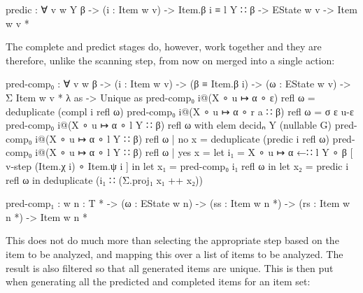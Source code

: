 		\begin{code}
			  predic : ∀ {v w Y β} ->
			    (i : Item w v) -> Item.β i ≡ l Y ∷ β ->
			    EState w v ->
			    Item w v *
		\end{code}

		The complete and predict stages do, however, work together and they are
		therefore, unlike the scanning step, from now on merged into a single
		action:

		\begin{code}
			  pred-comp₀ : ∀ {v w β} ->
			    (i : Item w v) ->
			    (β ≡ Item.β i) ->
			    (ω : EState w v) ->
			    Σ {Item w v *} λ as -> Unique as
			  pred-comp₀ i@(X ∘ u ↦ α ∘ ε) refl ω = deduplicate (compl i refl ω)
			  pred-comp₀ i@(X ∘ u ↦ α ∘ r a ∷ β) refl ω = σ ε u-ε
			  pred-comp₀ i@(X ∘ u ↦ α ∘ l Y ∷ β) refl ω with elem decidₙ Y (nullable G)
			  pred-comp₀ i@(X ∘ u ↦ α ∘ l Y ∷ β) refl ω | no x = deduplicate (predic i refl ω)
			  pred-comp₀ i@(X ∘ u ↦ α ∘ l Y ∷ β) refl ω | yes x =
			    let i₁ = X ∘ u ↦ α ←∷ l Y ∘ β [ v-step (Item.χ i) ∘ Item.ψ i ] in
			    let x₁ = pred-comp₀ i₁ refl ω in
			    let x₂ = predic i refl ω in
			    deduplicate (i₁ ∷ (Σ.proj₁ x₁ ++ x₂))

			  pred-comp₁ : {w n : T *} -> (ω : EState w n) ->
			    (ss : Item w n *) -> (rs : Item w n *) -> Item w n *
		\end{code}

		This does not do much more than selecting the appropriate step based on
		the item to be analyzed, and mapping this over a list of items to be
		analyzed. The result is also filtered so that all generated items are
		unique. This is then put when generating all the predicted and
		completed items for an item set:

